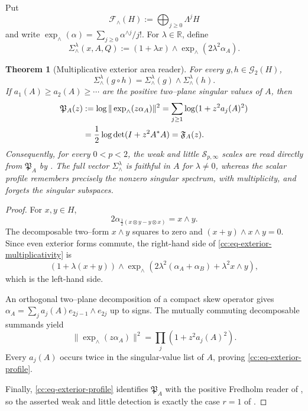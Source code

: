 \documentclass[10pt,reqno]{amsart}
\theoremstyle{plain}
\newtheorem{theorem}{Theorem}[section]
\theoremstyle{definition}
\theoremstyle{remark}
\begin{document}
Put
\[
 \mathcal F_{\wedge}(H):=\bigoplus_{j\geq0}\Lambda^jH
\]
and write
\(\exp_{\wedge}(\alpha)=\sum_{j\geq0}\alpha^{\wedge j}/j!\).
For \(\lambda\in\mathbb R\), define
\begin{equation}
 \Sigma_{\wedge}^{\lambda}(x,A,Q)
 :=(1+\lambda x)\wedge
   \exp_{\wedge}(2\lambda^2\alpha_A).
 \label{cc:eq-exterior-reader}
\end{equation}

\begin{theorem}[Multiplicative exterior area reader]
\label{cc:thm-multiplicative-exterior-reader}
For every \(g,h\in\mathcal G_2(H)\),
\begin{equation}
 \Sigma_{\wedge}^{\lambda}(g\circ h)
 =\Sigma_{\wedge}^{\lambda}(g)\wedge
  \Sigma_{\wedge}^{\lambda}(h).
 \label{cc:eq-exterior-multiplicativity}
\end{equation}
If \(a_1(A)\geq a_2(A)\geq\cdots\) are the positive two--plane
singular values of \(A\), then
\begin{align}
 \mathfrak P_A(z)
 &:=\log\|\exp_{\wedge}(z\alpha_A)\|^2
   =\sum_{j\geq1}\log(1+z^2a_j(A)^2) \notag\\
 &=\frac12\log\det(I+z^2A^*A)
   =\mathfrak F_A(z).
 \label{cc:eq-exterior-profile}
\end{align}
Consequently, for every \(0<p<2\), the weak and little
\(\mathcal S_{p,\infty}\) scales are read directly from \(\mathfrak P_A\)
by .  The full vector
\(\Sigma_{\wedge}^{\lambda}\) is faithful in \(A\) for
\(\lambda\ne0\), whereas the scalar profile remembers precisely the nonzero
singular spectrum, with multiplicity, and forgets the singular subspaces.
\end{theorem}

\begin{proof}
For \(x,y\in H\),
\[
 2\alpha_{\frac12(x\otimes y-y\otimes x)}=x\wedge y.
\]
The decomposable two--form \(x\wedge y\) squares to zero and
\((x+y)\wedge x\wedge y=0\).  Since even exterior forms commute, the
right-hand side of \eqref{cc:eq-exterior-multiplicativity} is
\[
 (1+\lambda(x+y))\wedge
 \exp_{\wedge}\!\left(
  2\lambda^2(\alpha_A+\alpha_B)+\lambda^2x\wedge y
 \right),
\]
which is the left-hand side.

An orthogonal two--plane decomposition of a compact skew operator gives
\(
 \alpha_A=\sum_j a_j(A)e_{2j-1}\wedge e_{2j}
\)
up to signs.  The mutually commuting decomposable summands yield
\[
 \|\exp_{\wedge}(z\alpha_A)\|^2
 =\prod_j(1+z^2a_j(A)^2).
\]
Every \(a_j(A)\) occurs twice in the singular-value list of \(A\), proving
\eqref{cc:eq-exterior-profile}.

Finally, \eqref{cc:eq-exterior-profile} identifies
\(\mathfrak P_A\) with the positive Fredholm reader of
, so the asserted weak and little detection is
exactly the case \(r=1\) of .
\end{proof}
\end{document}
